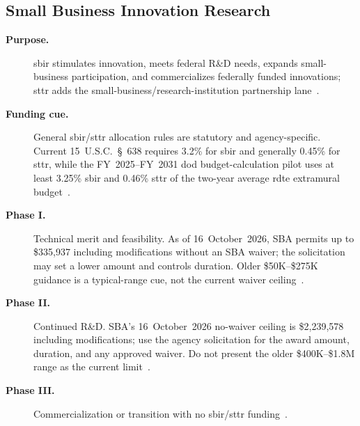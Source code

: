 \documentclass[../main.tex]{subfiles}
\begin{document}
\subsection{Small Business Innovation Research}
\begin{description}
  \item[\textbf{Purpose.}] \ac{sbir} stimulates innovation, meets federal R\&D needs, expands small-business participation, and commercializes federally funded innovations; \ac{sttr} adds the small-business/research-institution partnership lane~\autocite{edo-3-3-4-research-development-2025,USC-638-SBIR,SBIR-Apply-2026}.
  \item[\textbf{Funding cue.}] General \ac{sbir}/\ac{sttr} allocation rules are statutory and agency-specific. Current 15~U.S.C.~\S~638 requires 3.2\% for \ac{sbir} and generally 0.45\% for \ac{sttr}, while the FY~2025--FY~2031 \ac{dod} budget-calculation pilot uses at least 3.25\% \ac{sbir} and 0.46\% \ac{sttr} of the two-year average \ac{rdte} extramural budget~\autocite{USC-638-SBIR}.
  \item[\textbf{Phase I.}] Technical merit and feasibility. As of 16~October~2026, SBA permits up to \$335{,}937 including modifications without an SBA waiver; the solicitation may set a lower amount and controls duration. Older \$50K--\$275K guidance is a typical-range cue, not the current waiver ceiling~\autocite{SBA-SBIR-Limits-20261016,SBIR-Apply-2026}.
  \item[\textbf{Phase II.}] Continued R\&D. SBA's 16~October~2026 no-waiver ceiling is \$2{,}239{,}578 including modifications; use the agency solicitation for the award amount, duration, and any approved waiver. Do not present the older \$400K--\$1.8M range as the current limit~\autocite{SBA-SBIR-Limits-20261016,SBIR-Apply-2026}.
  \item[\textbf{Phase III.}] Commercialization or transition with no \ac{sbir}/\ac{sttr} funding~\autocite{edo-3-3-4-research-development-2025,SBIR-Apply-2026}.
\end{description}
\end{document}
